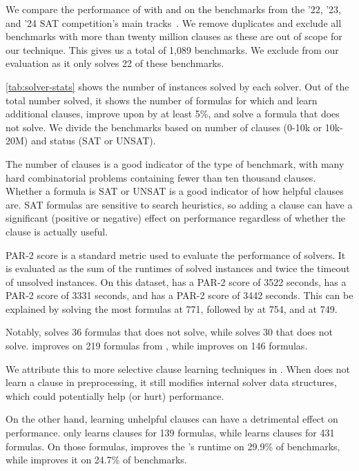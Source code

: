 We compare the performance of \tool with \cadical and \prelearn on the
benchmarks from the '22, '23, and '24 SAT competition's main
tracks~\cite{satcomp2022,satcomp2023,satcomp2024}. We remove duplicates and
exclude all benchmarks with more than twenty million clauses as these are out of
scope for our technique. This gives us a total of 1,089 benchmarks. We exclude
\sadical from our evaluation as it only solves 22 of these benchmarks.

\autoref{tab:solver-stats} shows the number of instances solved by each solver.
Out of the total number solved, it shows the number of formulas for which
\prelearn and \tool learn additional \pr clauses, improve upon \cadical by at
least 5\%, and solve a formula that \cadical does not solve. We divide the
benchmarks based on number of clauses (0-10k or 10k-20M) and status (SAT or
UNSAT). 

The number of clauses is a good indicator of the type of benchmark, with many
hard combinatorial problems containing fewer than ten thousand clauses.
Whether a formula is SAT or UNSAT is a good indicator of how helpful \pr clauses
are. SAT formulas are sensitive to search heuristics, so adding a \pr clause can
have a significant (positive or negative) effect on performance regardless of
whether the clause is actually useful.

PAR-2 score is a standard metric used to evaluate the performance of solvers. It
is evaluated as the sum of the runtimes of solved instances and twice the
timeout of unsolved instances. On this dataset, \cadical has a PAR-2 score of
3522 seconds, \prelearn has a PAR-2 score of 3331 seconds, and \tool has a
PAR-2 score of 3442 seconds. This can be explained by \prelearn solving the
most formulas at 771, followed by \tool at 754, and \cadical at 749.

Notably, \tool solves 36 formulas that \cadical does not solve, while \prelearn
solves 30 that \cadical does not solve. \tool improves on 219 formulas from
\cadical, while \prelearn improves on 146 formulas. 

We attribute this to more selective \pr clause learning techniques in \tool.
When \tool does not learn a \pr clause in preprocessing, it still modifies
internal solver data structures, which could potentially help (or hurt)
performance.

On the other hand, learning unhelpful \pr clauses can have a detrimental effect
on performance. \tool only learns \pr clauses for 139 formulas, while
\prelearn learns \pr clauses for 431 formulas. On those formulas,
\tool improves the \cadical's runtime on 29.9\% of benchmarks, while \prelearn
improves it on 24.7\% of benchmarks.

